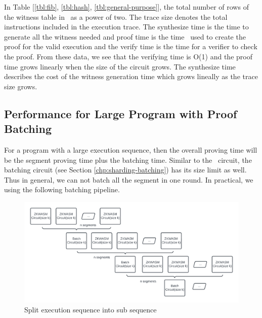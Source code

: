 In Table [\ref{tbl:fib}, \ref{tbl:hash}, \ref{tbl:general-purpose}], the total number of rows of the witness table in \zkwasm\, as a power of two. The trace size denotes the total instructions included in the execution trace. The synthesize time is the time to generate all the witness needed and proof time is the time \zkwasm\, used to create the proof for the valid execution and the verify time is the time for a verifier to check the proof. From these data, we see that the verifying time is O(1) and the proof time grows linearly when the size of the circuit grows. The synthesize time describes the cost of the witness generation time which grows lineally as the trace size grows.
\subsection{Performance for Large Program with Proof Batching}
For a program with a large execution sequence, then the overall proving time will be the segment proving time plus the batching time. Similar to the \zkwasm\, circuit, the batching circuit (see Section \ref{chp:sharding-batching}) has its size limit as well. Thus in general, we can not batch all the segment in one round. In practical, we using the following batching pipeline.
\begin{figure}[!ht]
\centerline{
\includegraphics[scale=0.6]{figs/batch-pipeline.png}
}
\caption{Split execution sequence into sub sequence}
\label{fig:batch-pipeline}
\end{figure}


